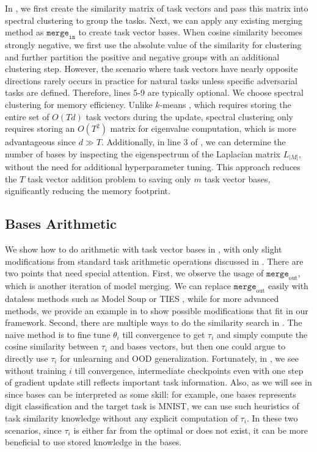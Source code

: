 In , we first create the similarity matrix of task vectors and pass this matrix into spectral clustering \citep{ng2001spectral} to group the tasks. Next, we can apply any existing merging method as $\texttt{merge}_\texttt{in}$ to create task vector bases. When cosine similarity becomes strongly negative, we first use the absolute value of the similarity for clustering and further partition the positive and negative groups with an additional clustering step. However, the scenario where task vectors have nearly opposite directions rarely occurs in practice for natural tasks unless specific adversarial tasks are defined. Therefore, lines 5-9 are typically optional. We choose spectral clustering for memory efficiency. Unlike $k$-means \citep{lloyd1982least}, which requires storing the entire set of $O(Td)$ task vectors during the update, spectral clustering only requires storing an $O(T^2)$ matrix for eigenvalue computation, which is more advantageous since $d \gg T$. Additionally, in line 3 of , we can determine the number of bases by inspecting the eigenspectrum of the Laplacian matrix $L_{|M|}$, without the need for additional hyperparameter tuning. This approach reduces the $T$ task vector addition problem to saving only $m$ task vector bases, significantly reducing the memory footprint.




\subsection{Bases Arithmetic}
\label{sec:bases_arithmetic}
 
We show how to do arithmetic with task vector bases in , with only slight modifications from standard task arithmetic operations discussed in . There are two points that need special attention. First, we observe the usage of $\texttt{merge}_\text{out}$, which is another iteration of model merging. We can replace $\texttt{merge}_\text{out}$ easily with dataless methods such as Model Soup \cite{pmlr-v162-wortsman22a} or TIES \cite{yadav2024ties}, while for more advanced methods, we provide an example in  to show possible modifications that fit in our framework. Second, there are multiple ways to do the similarity search in . The naive method is to fine tune $\theta_i$ till convergence to get $\tau_i$ and simply compute the cosine similarity between $\tau_i$ and bases vectors, but then one could argue to directly use $\tau_i$ for unlearning and OOD generalization. Fortunately, in , we see without training $i$ till convergence, intermediate checkpoints even with one step of gradient update still reflects important task information. Also, as we will see in  since bases can be interpreted as some skill: for example, one bases represents digit classification and the target task is MNIST, we can use such heuristics of task similarity knowledge without any explicit computation of $\tau_i$. In these two scenarios, since $\tau_i$ is either far from the optimal or does not exist, it can be more beneficial to use stored knowledge in the bases.

